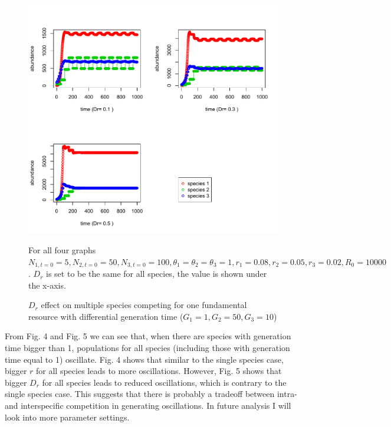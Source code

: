 \documentclass[12pt]{article}
\begin{document}
\begin{figure}
 \includegraphics[width=\textwidth]{oscillation_Dreffect.pdf}
 \caption{$D_r$ effect on multiple species competing for one fundamental resource with differential generation time ($G_1=1, G_2=50, G_3=10$)}
For all four graphs $ N_{1,t=0}=5, N_{2,t=0}=50,N_{3,t=0}=100, \theta_1=\theta_2=\theta_3=1, r_1=0.08, r_2 =0.05, r_3= 0.02, R_0=10000$. $D_r$ is set to be the same for all species, the value is shown under the x-axis.
\end{figure}

From Fig. 4 and Fig. 5 we can see that, when there are species with generation time bigger than 1, populations for all species (including those with generation time equal to 1) oscillate. Fig. 4 shows that similar to the single species case, bigger $r$ for all species leads to more oscillations. However, Fig. 5 shows that bigger $D_r$ for all species leads to reduced oscillations, which is contrary to the single species case. This suggests that there is probably a tradeoff between intra- and interspecific competition in generating oscillations. In future analysis I will look into more parameter settings.
\end{document}
